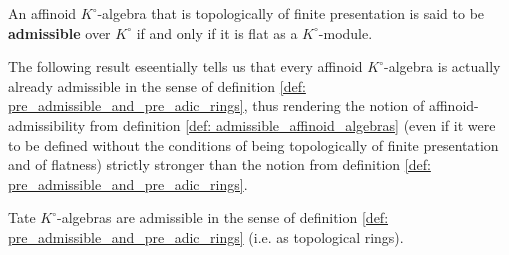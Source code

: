             \begin{definition} \label{def: admissible_affinoid_algebras}
                An affinoid $K^{\circ}$-algebra that is topologically of finite presentation is said to be \textbf{admissible} over $K^{\circ}$ if and only if it is flat as a $K^{\circ}$-module. 
            \end{definition}
            The following result eseentially tells us that every affinoid $K^{\circ}$-algebra is actually already admissible in the sense of definition \ref{def: pre_admissible_and_pre_adic_rings}, thus rendering the notion of affinoid-admissibility from definition \ref{def: admissible_affinoid_algebras} (even if it were to be defined without the conditions of being topologically of finite presentation and of flatness) strictly stronger than the notion from definition \ref{def: pre_admissible_and_pre_adic_rings}. 
            \begin{proposition} \label{prop: tate_algebras_over_valuation_rings_are_topologically_pre_admissible}
                Tate $K^{\circ}$-algebras are admissible in the sense of definition \ref{def: pre_admissible_and_pre_adic_rings} (i.e. as topological rings).
            \end{proposition}
